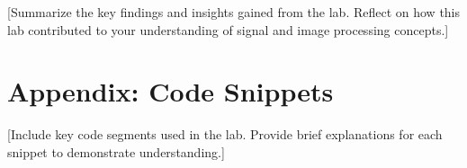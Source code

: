 \documentclass[11pt,a4paper]{article}
\begin{document}
[Summarize the key findings and insights gained from the lab.
Reflect on how this lab contributed to your understanding of
signal and image processing concepts.]

\section*{Appendix: Code Snippets}

[Include key code segments used in the lab.
Provide brief explanations for each snippet to demonstrate understanding.]
\printbibliography
\end{document}
